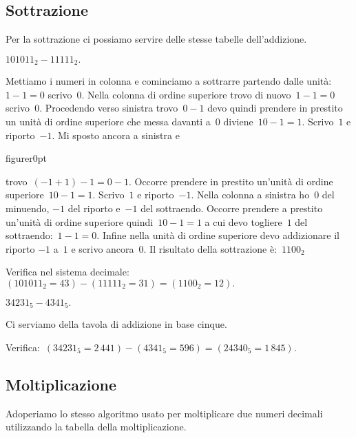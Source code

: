 \subsection{Sottrazione}

Per la sottrazione ci possiamo servire delle stesse tabelle
dell'addizione.

\begin{exrig}
\begin{esempio}
$101011_{2}-11111_{2}.$
\end{esempio}

Mettiamo i numeri in colonna e cominciamo a sottrarre partendo dalle
unità:~$1-1=0$ scrivo~$0$.
Nella colonna di ordine superiore trovo di nuovo~$1-1=0$ scrivo~$0$.
Procedendo verso sinistra trovo~$0-1$ devo quindi prendere in prestito
un unità di ordine superiore che messa davanti a~0 diviene~$10-1=1$.
Scrivo~$1$ e riporto~$-1$. Mi sposto ancora a sinistra e
\begin{wrapfloat}{figure}{r}{0pt}
 
\end{wrapfloat}
trovo~$(-1+1)-1=0-1$. Occorre prendere in
prestito un'unità di ordine superiore~$10-1=1$.
Scrivo~$1$ e riporto~$-1$.
Nella colonna a sinistra ho~$0$ del minuendo, $-1$ del riporto e~$-1$
del sottraendo. Occorre prendere a prestito un'unità
di ordine superiore quindi~$10-1=1$ a cui devo togliere~$1$ del
sottraendo:~$1-1=0$.
Infine nella unità di ordine superiore devo addizionare il riporto
$-1$ a~$1$ e scrivo ancora~$0$. Il risultato della sottrazione è:~$1100_2$

Verifica nel sistema decimale:~$(101011_{2}=43)-(11111_{2}=31)=(1100_{2}=12).$


\begin{esempio}
$34231_{5}-4341_{5}.$

Ci serviamo della tavola di addizione in base cinque.
\begin{center}
 
\end{center}
Verifica:~$(34231_{5}=2\,441)-(4341_{5}=596)=(24340_{5}=1\,845).$
\end{esempio}
\end{exrig}

\ovalbox{\risolvii \ref{ese:4.24}, \ref{ese:4.25}, \ref{ese:4.26}}

\subsection{Moltiplicazione}

Adoperiamo lo stesso algoritmo usato per moltiplicare due numeri
decimali utilizzando la tabella della moltiplicazione.

